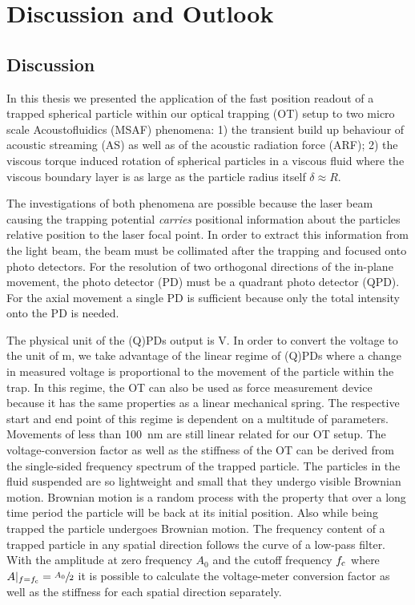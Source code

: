 \chapter[Discussion \& Outlook]{Discussion and Outlook}\label{ch:discussion}

\section{Discussion}
In this thesis we presented the application of the fast position readout of a 
trapped spherical particle within our optical trapping (OT) setup to two micro 
scale Acoustofluidics (MSAF) phenomena: 1) the transient build up behaviour of 
acoustic streaming (AS) as well as of the acoustic radiation force (ARF); 2) 
the viscous torque induced rotation of spherical particles in a viscous fluid 
where the viscous boundary layer is as large as the particle radius itself 
$\delta \approx R$.

The investigations of both phenomena are possible because the laser beam 
causing the trapping potential \emph{carries} positional information about the 
particles relative position to the laser focal point. In order to extract this 
information from the light beam, the beam must be collimated after the trapping 
and focused onto photo detectors. For the resolution of two orthogonal 
directions of the in-plane movement, the photo detector (PD) must be a quadrant 
photo detector (QPD). For the axial movement a single PD is sufficient because 
only the total intensity onto the PD is needed.

The physical unit of the (Q)PDs output is \si{\volt}. In order to convert the 
voltage to the unit of \si{\meter}, we take advantage of the linear regime of 
(Q)PDs where a change in measured voltage is proportional to the movement of 
the particle within the trap. In this regime, the OT can also be used as force 
measurement device because it has the same properties as a linear mechanical 
spring. The respective start and end point of this regime is dependent on a 
multitude of parameters. Movements of less than \SI{100}{\nm} are still linear 
related for our OT setup. The voltage-conversion factor as well as the 
stiffness of the OT can be derived from the single-sided frequency spectrum of 
the trapped particle.  The particles in the fluid suspended are so lightweight 
and small that they undergo visible Brownian motion. Brownian motion is a 
random process with the property that over a long time period the particle will 
be back at its initial position. Also while being trapped the particle 
undergoes Brownian motion. The frequency content of a trapped particle in any 
spatial direction follows the curve of a low-pass filter. With the amplitude at 
zero frequency $A_{0}$ and the cutoff frequency $f_{\mathrm{c}}$ where 
$A\vert_{f=f_{\mathrm{c}}}=\sfrac{A_{0}}{2}$ it is possible to calculate the 
voltage-meter conversion factor as well as the stiffness for each spatial 
direction separately.


